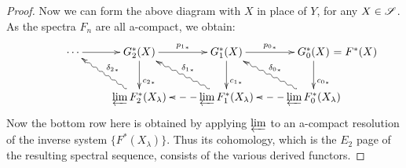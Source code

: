 \documentclass[11pt]{article}
\theoremstyle{plain}
\theoremstyle{definition}
\begin{document}
{\begin{proof}
Now we can form the above diagram with $X$ in place of $Y$, for any $X\in\mathscr{S}$.
As the spectra $F_n$ are all a-compact, we obtain:
\[\xymatrix{
\cdots\ar[r]&
G^*_2(X)\ar[r]^{{p_1}_*}\ar[d]^(.65){{c_2}_*}&
G^*_1(X)\ar[r]^{{p_0}_*}\ar[d]^(.65){{c_1}_*}&
G^*_0(X)\ar[d]^(.65){{c_0}_*}\makebox[0cm][l]{\ $=F^*(X)$}\\%
&\varprojlim F^*_2(X_\lambda)\ar@{~>}[lu]_{{\delta_2}_*}
&\varprojlim F^*_1(X_\lambda)\ar@{~>}[lu]_{{\delta_1}_*}\ar@{-->}[l]
&\varprojlim F^*_0(X_\lambda)\ar@{~>}[lu]_{{\delta_0}_*}\ar@{-->}[l]
}\]
Now the bottom row here is obtained by applying $\varprojlim$ to an a-compact
resolution of the inverse system $\{F^*(X_\lambda)\}$. Thus its cohomology,
which is the $E_2$ page of the resulting spectral sequence, consists of the
various derived functors.


\end{proof}}
\end{document}

